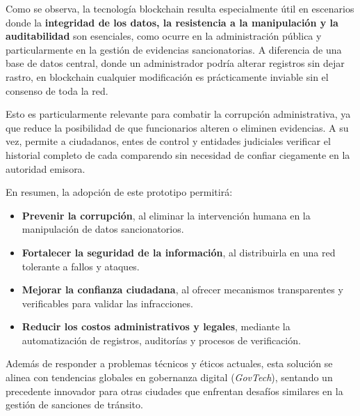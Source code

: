 

Como se observa, la tecnología blockchain resulta especialmente útil en escenarios donde la \textbf{integridad de los datos, la resistencia a la manipulación y la auditabilidad} son esenciales, como ocurre en la administración pública y particularmente en la gestión de evidencias sancionatorias. A diferencia de una base de datos central, donde un administrador podría alterar registros sin dejar rastro, en blockchain cualquier modificación es prácticamente inviable sin el consenso de toda la red.

Esto es particularmente relevante para combatir la corrupción administrativa, ya que reduce la posibilidad de que funcionarios alteren o eliminen evidencias. A su vez, permite a ciudadanos, entes de control y entidades judiciales verificar el historial completo de cada comparendo sin necesidad de confiar ciegamente en la autoridad emisora.

En resumen, la adopción de este prototipo permitirá:

\begin{itemize}
    \item \textbf{Prevenir la corrupción}, al eliminar la intervención humana en la manipulación de datos sancionatorios.
    \item \textbf{Fortalecer la seguridad de la información}, al distribuirla en una red tolerante a fallos y ataques.
    \item \textbf{Mejorar la confianza ciudadana}, al ofrecer mecanismos transparentes y verificables para validar las infracciones.
    \item \textbf{Reducir los costos administrativos y legales}, mediante la automatización de registros, auditorías y procesos de verificación.
\end{itemize}

Además de responder a problemas técnicos y éticos actuales, esta solución se alinea con tendencias globales en gobernanza digital (\textit{GovTech}), sentando un precedente innovador para otras ciudades que enfrentan desafíos similares en la gestión de sanciones de tránsito. 